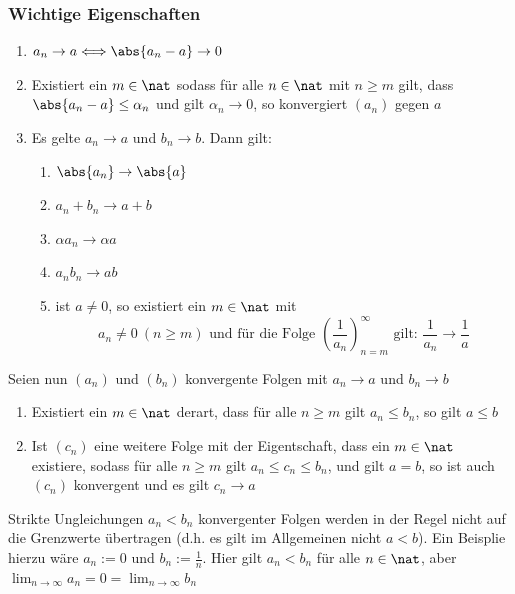 \documentclass{kit}
\begin{document}
    \subsubsection{Wichtige Eigenschaften}
      \begin{enumerate}
        \item $a_n\rightarrow a\Longleftrightarrow\abs{a_n-a}\rightarrow0$
        \item Existiert ein $m\in\nat$ sodass für alle $n\in\nat$ mit $n\ge m$ gilt, dass $\abs{a_n-a}\le\alpha_n$ und gilt $\alpha_n\rightarrow0$, so konvergiert $(a_n)$ gegen $a$
        \item Es gelte $a_n\rightarrow a$ und $b_n\rightarrow b$. Dann gilt:\\
        \begin{enumerate}[label=\roman*)]
          \item $\abs{a_n}\rightarrow\abs{a}$
          \item $a_n+b_n\rightarrow a+b$
          \item $\alpha a_n\rightarrow\alpha a$
          \item $a_nb_n\rightarrow ab$
          \item ist $a\neq0$, so existiert ein $m\in\nat$ mit
            $$a_n\neq0\ (n\ge m)\text{ und für die Folge }\left(\frac{1}{a_n}\right)^\infty_{n=m}\text{ gilt: }\frac{1}{a_n}\rightarrow\frac{1}{a}$$
        \end{enumerate}
      \end{enumerate}
      Seien nun $(a_n)$ und $(b_n)$ konvergente Folgen mit $a_n\rightarrow a$ und $b_n\rightarrow b$
      \begin{enumerate}
        \item Existiert ein $m\in\nat$ derart, dass für alle $n\ge m$ gilt $a_n\le b_n$, so gilt $a\le b$
        \item Ist $(c_n)$ eine weitere Folge mit der Eigentschaft, dass ein $m\in\nat$ existiere, sodass für alle $n\ge m$ gilt $a_n\le c_n\le b_n$, und gilt $a=b$, so ist auch $(c_n)$ konvergent und es gilt $c_n\rightarrow a$
      \end{enumerate}
      Strikte Ungleichungen $a_n<b_n$ konvergenter Folgen werden in der Regel nicht auf die Grenzwerte übertragen (d.h. es gilt im Allgemeinen nicht $a<b$).
      Ein Beisplie hierzu wäre $a_n:=0$ und $b_n:=\frac{1}{n}$. Hier gilt $a_n<b_n$ für alle $n\in\nat$, aber $\lim_{n\rightarrow\infty}a_n=0=\lim_{n\rightarrow\infty}b_n$
\pagebreak
\end{document}
